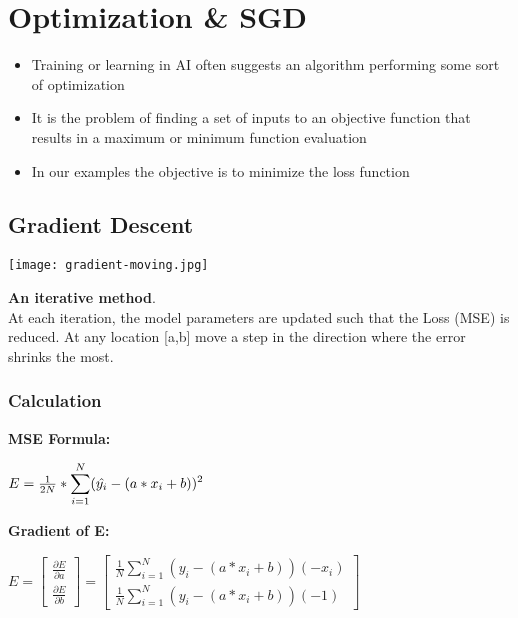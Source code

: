 \section{Optimization \& SGD}
\begin{itemize}
    \item Training or learning in AI often suggests an algorithm performing some sort of optimization
    \item It is the problem of finding a set of inputs to an objective function that results in a maximum or minimum function evaluation
    \item In our examples the objective is to minimize the loss function
\end{itemize}

\subsection{Gradient Descent}


\begin{minipage}{0.5\linewidth}
    \begin{center}
        \texttt{[image: gradient-moving.jpg]}
        \vspace{-8pt}
    \end{center}
\end{minipage}
\begin{minipage}{0.45\linewidth}
    \textbf{An iterative method}.\\
    At each iteration, the model parameters are updated such that the Loss (MSE) is reduced.
    At any location [a,b] move a step in the direction where the error shrinks the most.\\
\end{minipage}

\subsubsection{Calculation}
\textbf{MSE Formula:}
\begin{center}
    $E = \frac{1}{2N} * \large\displaystyle\sum_{i = 1}^{N}(\hat{y_i} - (a*x_i + b))^2$
\end{center}
\textbf{Gradient of E:}
\begin{center}
    $
        E = \left[\begin{array}{c} \frac{\partial E}{\partial a} \\ \frac{\partial E}{\partial b} \end{array}\right]
        = \left[\begin{array}{c} \frac{1}{N} \sum_{i=1}^N (y_i - (a * x_i + b))(-x_i) \\ \frac{1}{N} \sum_{i=1}^N (y_i - (a * x_i + b))(-1) \end{array}\right]
    $
\end{center}


